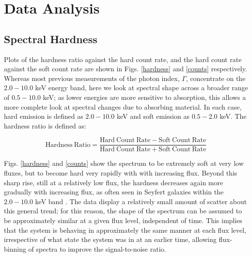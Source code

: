 \documentclass[useAMS,usenatbib]{sam}
\begin{document}
\section{Data Analysis}

\subsection{Spectral Hardness}

Plots of the hardness ratio against the hard count rate, and the hard count rate against the soft count rate are shown in Figs. \ref{hardness} and \ref{counts}
respectively. Whereas most previous measurements of the photon index, $\Gamma$, concentrate on the $2.0-10.0$ keV energy band, here we look at spectral shape across a
broader range of $0.5-10.0$ keV; as lower energies are more sensitive to absorption, this allows a more complete look at spectral changes due to absorbing material. In
each case, hard emission is defined as $2.0 - 10.0$ keV and soft emission as $0.5-2.0$ keV. The hardness ratio is defined as: 

\begin{equation*}
\mathrm{Hardness\ Ratio} = \frac{\mathrm{Hard\ Count\ Rate} - \mathrm{Soft\ Count\ Rate}}{\mathrm{Hard\ Count\ Rate} + \mathrm{Soft\ Count\ Rate}}
\end{equation*}
\hspace{0.5cm}
 
 Figs. \ref{hardness} and \ref{counts} show the spectrum to be extremely soft at very low fluxes, but to become hard very rapidly with with increasing flux. Beyond
this sharp rise, still at a
relatively low flux, the hardness decreases again more gradually with increasing flux, as often seen in Seyfert galaxies within the $2.0-10.0$ keV band 
\citep[e.g.][]{sobolewska,lamer}. The data display a relatively small amount of scatter about this general trend; for this reason, the shape of the spectrum can
be assumed to be approximately similar at a given flux level, independent of time. This implies that the system is behaving in approximately the same manner at each flux
level, irrespective of what state the system was in at an earlier time, allowing flux-binning of spectra to improve the signal-to-noise ratio.
\end{document}
